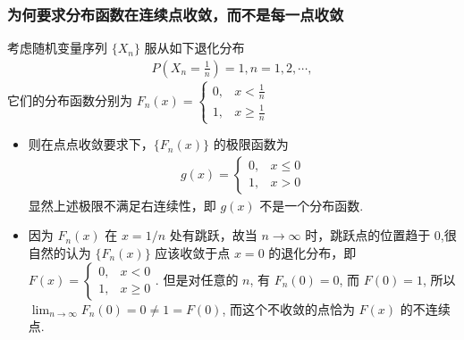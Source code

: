 \documentclass[Prob-All.tex]{subfiles}
\begin{document}
\begin{frame}
	\frametitle{为何要求分布函数在连续点收敛，而不是每一点收敛}
	\begin{exam}
		考虑随机变量序列 $\{X_n\}$ 服从如下退化分布
		\begin{eqnarray*}
			P(X_n=\frac{1}{n})=1, n=1,2,\cdots,
		\end{eqnarray*}
		它们的分布函数分别为 $F_n (x)=\left\{
		\begin{array}{ll}
			0, & x<\frac{1}{n}\\
			1, &x\ge \frac{1}{n}
		\end{array}
		\right.$

		\pause
		\begin{itemize}[<+-|alert@+>]
			\item 则在点点收敛要求下，$\{F_n (x)\}$ 的极限函数为 \pause
			\begin{eqnarray*}
				g(x)=\left\{
				\begin{array}{ll}
					0, & x\le 0\\
					1, &x>0
				\end{array}
				\right.
			\end{eqnarray*}
			\pause 显然上述极限不满足右连续性，即 $g (x)$ 不是一个分布函数.\pause
			\item 因为 $F_n (x)$ 在 $x=1/n$ 处有跳跃，故当 $n\rightarrow\infty$ 时，跳跃点的位置趋于 0,\pause 很自然的认为 $\{F_n (x)\}$ 应该收敛于点 $x=0$ 的退化分布，即 $F (x)=\left\{
			\begin{array}{ll}
				0, & x<0\\
				1, &x\ge 0
			\end{array}
			\right.$. \pause 但是对任意的 $n$, 有 $F_n (0)=0$, 而 $F (0)=1$, 所以 $\lim_{n\rightarrow\infty} F_n (0)=0\neq 1=F (0)$, 而这个不收敛的点恰为 $F (x)$ 的不连续点.
		\end{itemize}
	\end{exam}
\end{frame}
\end{document}
